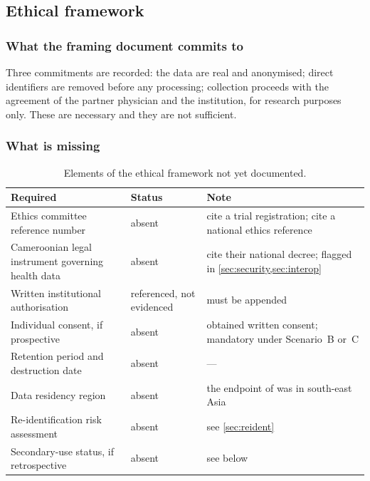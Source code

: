 \documentclass[12pt,a4paper,oneside]{report}
\begin{document}
\subsection{Ethical framework}\label{sec:ethics}

\subsubsection{What the framing document commits to}

Three commitments are recorded: the data are real and anonymised; direct identifiers are removed before any processing; collection proceeds with the agreement of the partner physician and the institution, for research purposes only. These are necessary and they are not sufficient.

\subsubsection{What is missing}

\begin{table}[htbp]
\centering\footnotesize
\caption{Elements of the ethical framework not yet documented.}\label{tab:ethics-gaps}
\begin{tabularx}{\textwidth}{@{}>{\raggedright\arraybackslash}p{4.6cm} >{\raggedright\arraybackslash}p{2.2cm} X@{}}
\toprule
\textbf{Required} & \textbf{Status} & \textbf{Note} \\
\midrule
Ethics committee reference number & absent & \textcite{mihevc2025} cite a trial registration; \textcite{bediang2021} cite a national ethics reference \\
Cameroonian legal instrument governing health data & absent & \textcite{mucchi2021} cite their national decree; flagged in \cref{sec:security,sec:interop} \\
Written institutional authorisation & referenced, not evidenced & must be appended \\
Individual consent, if prospective & absent & \textcite{efendi2025} obtained written consent; mandatory under Scenario~B or~C \\
Retention period and destruction date & absent & --- \\
Data residency region & absent & the endpoint of \textcite{efendi2025} was in south-east Asia \\
Re-identification risk assessment & absent & see \cref{sec:reident} \\
Secondary-use status, if retrospective & absent & see below \\
\bottomrule
\end{tabularx}
\end{table}
\end{document}
